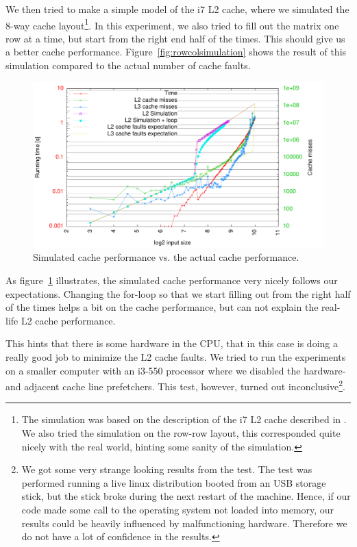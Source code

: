 We then tried to make a simple model of the i7 L2 cache, where we
simulated the 8-way cache layout\footnote{The simulation was based on
  the description of the i7 L2 cache described in \cite[p. 117 - 121]{Hanne}. We also tried the simulation on the row-row layout, this
  corresponded quite nicely with the real world, hinting some sanity
  of the simulation.}. In this experiment, we also tried to fill out
the matrix one row at a time, but start from the right end half of the
times. This should give us a better cache
performance. Figure~\ref{fig:rowcolsimulation} shows the result of
this simulation compared to the actual number of cache faults.
\begin{figure}[h!]
  \centering
  \includegraphics[width=\textwidth]{plots/rowcol_simulation}
  \caption{Simulated cache performance vs. the actual cache performance.}
  \label{fig:rowcol_simulation}
\end{figure}

As figure~\ref{fig:rowcol_simulation} illustrates, the simulated cache
performance very nicely follows our expectations. Changing the
for-loop so that we start filling out from the right half of the times
helps a bit on the cache performance, but can not explain the
real-life L2 cache performance.

This hints that there is some hardware in the CPU, that in this case
is doing a really good job to minimize the L2 cache faults. We tried
to run the experiments on a smaller computer with an i3-550 processor
where we disabled the hardware- and adjacent cache line
prefetchers. This test, however, turned out inconclusive\footnote{We
  got some very strange looking results from the test. The test was
  performed running a live linux distribution booted from an USB
  storage stick, but the stick broke during the next restart of the
  machine. Hence, if our code made some call to the operating system
  not loaded into memory, our results could be heavily influenced by
  malfunctioning hardware. Therefore we do not have a lot of
  confidence in the results.}.

